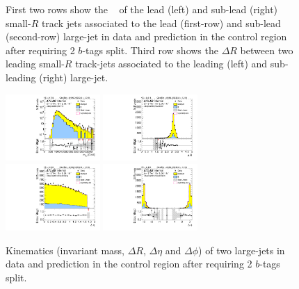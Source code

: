\begin{figure}[htbp!]
\begin{center}
  \caption{First two rows show the \pt~ of the lead (left) and sub-lead (right) small-$R$ track jets associated to the lead (first-row) and sub-lead (second-row) large-\R jet in data and prediction in the control region after requiring 2 $b$-tags split. Third row shows the $\Delta R$ between two leading small-$R$ track-jets associated to the leading (left) and sub-leading (right) large-\R jet.  }
  \label{fig:boosted-2bs-control-ak2}
\end{center}
\end{figure}


\begin{figure}[htbp!]
\begin{center}
\includegraphics[width=0.32\textwidth,angle=-90]{figures/boosted/Control/b77_TwoTag_split_Control_mHH_l_1.pdf}
\includegraphics[width=0.32\textwidth,angle=-90]{figures/boosted/Control/b77_TwoTag_split_Control_hCandDr.pdf}\\
\includegraphics[width=0.32\textwidth,angle=-90]{figures/boosted/Control/b77_TwoTag_split_Control_hCandDeta.pdf}
\includegraphics[width=0.32\textwidth,angle=-90]{figures/boosted/Control/b77_TwoTag_split_Control_hCandDphi.pdf}
  \caption{Kinematics (invariant mass, $\Delta R$, $\Delta \eta$ and $\Delta \phi$) of two large-\R jets in data and prediction in the control region after requiring 2 $b$-tags split.  }
  \label{fig:boosted-2bs-control-ak10-system}
\end{center}
\end{figure}